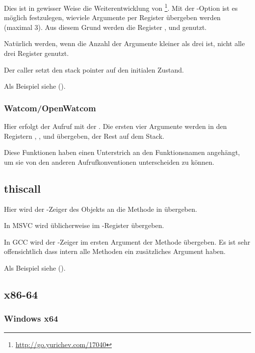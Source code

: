 \newcommand{\URLREGPARMM}{\url{http://go.yurichev.com/17040}}

Dies ist in gewisser Weise die Weiterentwicklung von \footnote{\URLREGPARMM}.
Mit der -Option ist es möglich festzulegen, wieviele Argumente per Register
übergeben werden (maximal 3).
Aus diesem Grund werden die Register \EAX, \EDX und \ECX genutzt.

Natürlich werden, wenn die Anzahl der Argumente kleiner als drei ist, nicht alle drei
Register genutzt.

Der \gls{caller} setzt den \gls{stack pointer} auf den initialen Zustand.

Als Beispiel siehe ().

\subsubsection{Watcom/OpenWatcom}

Hier erfolgt der Aufruf mit der .
Die ersten vier Argumente werden in den Registern \EAX, \EDX, \EBX und \ECX übergeben,
der Rest auf dem Stack.

Diese Funktionen haben einen Unterstrich an den Funktionsnamen angehängt, um sie von
den anderen Aufrufkonventionen unterscheiden zu können.

\subsection{thiscall}

Hier wird der \ITthis-Zeiger des Objekts an die Methode in \Cpp übergeben.

In MSVC wird \ITthis üblicherweise im \ECX-Register übergeben.

In GCC wird der \ITthis-Zeiger im ersten Argument der Methode übergeben.
Es ist sehr offensichtlich dass intern alle Methoden ein zusätzliches Argument haben.

Als Beispiel siehe ().

\subsection{x86-64}

\subsubsection{Windows x64}
\label{sec:callingconventions_win64}

